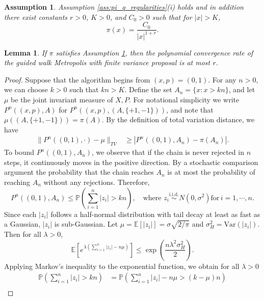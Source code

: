 \documentclass[10pt,a4paper]{amsart}
\newtheorem{assumption}{Assumption}
\newtheorem{lemma}{Lemma}
\begin{document}
\begin{assumption}
\label{ass:heavy-tailed}
Assumption \ref{ass:pi_q_regularities}(i) holds and in addition there exist constants $r>0$, $K>0$, and $C_0>0$ such that for $|x|>K$,
$$
\pi(x) = \frac{C_0}{|x|^{1+r}}.
$$  
\end{assumption}

\begin{lemma}
\label{lem:upperbound_polynomialtails}
    If $\pi$ satisfies Assumption \ref{ass:heavy-tailed}, then the polynomial convergence rate of the guided walk Metropolis with finite variance proposal is at most $r$.
\end{lemma}

\begin{proof}
Suppose that the algorithm begins from $(x,p) = (0,1)$. For any $n>0$, we can choose $k>0$ such that $kn>K$. Define the set $A_n = \{x:x>kn\}$, and let $\mu$ be the joint invariant measure of $X,P$. For notational simplicity we write $P^n((x,p),A)$ for $P^n((x,p),(A,\{+1,-1\}))$, and note that $\mu((A,\{+1,-1\})) = \pi(A)$.  By the definition of total variation distance, we have
\begin{align}
    \|P^n((0,1),\cdot) - \mu\|_{TV} &\ge |P^n((0,1),A_n) - \pi(A_n)|.
\end{align}    
To bound $P^n((0,1),A_n)$, we observe that if the chain is never rejected in $n$ steps, it continuously moves in the positive direction. By a stochastic comparison argument the probability that the chain reaches $A_n$ is at most the probability of reaching $A_n$ without any rejections. Therefore,
\begin{equation*}
    P^n((0,1),A_n) \le \mathbb{P}\left(\sum_{i=1}^n |z_i|>kn\right), \quad \text{where } z_i \stackrel{\text{i.i.d.}}{\sim} N(0,\sigma^2) \text{for} \, i=1, \cdots ,n.
\end{equation*}
Since each $|z_i|$ follows a half-normal distribution with tail decay at least as fast as a Gaussian, $|z_i|$ is sub-Gaussian. Let $\mu = \mathbb{E}[|z_i|] = \sigma\sqrt{2/\pi}$ and $\sigma_H^2 = \text{Var}(|z_i|)$. Then for all $\lambda>0$,
\begin{equation*}
    \mathbb{E}\left[e^{\lambda(\sum_{i=1}^n |z_i| - n\mu)}\right]\le \exp\left(\frac{n\lambda^2\sigma_H^2}{2}\right).
\end{equation*}
Applying Markov's inequality to the exponential function, we obtain for all $\lambda>0$
\begin{equation}
\begin{aligned}
    \mathbb{P}\left(\sum_{i=1}^n|z_i| >kn\right) &= \mathbb{P}\left(\sum_{i=1}^n|z_i| - n\mu>(k-\mu)n\right)\\

\end{aligned}
\end{equation}
\end{proof}
\end{document}

